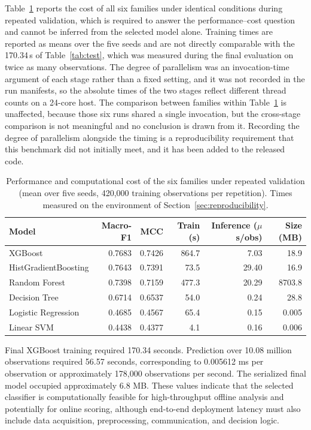 \documentclass[12pt,a4paper]{article}
\begin{document}
Table~\ref{tab:cost} reports the cost of all six families under identical
conditions during repeated validation, which is required to answer the
performance--cost question and cannot be inferred from the selected model
alone. Training times are reported as means over the five seeds and are
not directly comparable with the 170.34\,s of Table~\ref{tab:test}, which was
measured during the final evaluation on twice as many observations. The
degree of parallelism was an invocation-time argument of each stage rather
than a fixed setting, and it was not recorded in the run manifests, so the
absolute times of the two stages reflect different thread counts on a 24-core
host. The comparison between families within Table~\ref{tab:cost} is
unaffected, because those six runs shared a single invocation, but the
cross-stage comparison is not meaningful and no conclusion is drawn from it.
Recording the degree of parallelism alongside the timing is a reproducibility
requirement that this benchmark did not initially meet, and it has been added
to the released code.

\begin{table}[t]
\centering
\caption{Performance and computational cost of the six families under repeated
validation (mean over five seeds, 420,000 training observations per
repetition). Times measured on the environment of
Section~\ref{sec:reproducibility}.}
\label{tab:cost}
\small
\begin{tabular}{lrrrrr}
\toprule
Model & Macro-F1 & MCC & Train (s) & Inference ($\mu$s/obs) & Size (MB)\\
\midrule
XGBoost              & 0.7683 & 0.7426 & 864.7 & 7.03 & 18.9\\
HistGradientBoosting & 0.7643 & 0.7391 & 73.5 & 29.40 & 16.9\\
Random Forest        & 0.7398 & 0.7159 & 477.3 & 20.29 & 8703.8\\
Decision Tree        & 0.6714 & 0.6537 & 54.0 & 0.24 & 28.8\\
Logistic Regression  & 0.4685 & 0.4567 & 65.4 & 0.15 & 0.005\\
Linear SVM           & 0.4438 & 0.4377 & 4.1 & 0.16 & 0.006\\
\bottomrule
\end{tabular}
\end{table}

Final XGBoost training required 170.34 seconds. Prediction over 10.08 million
observations required 56.57 seconds, corresponding to 0.005612 ms per
observation or approximately 178,000 observations per second. The serialized
final model occupied approximately 6.8 MB. These values indicate that the
selected classifier is computationally feasible for high-throughput offline
analysis and potentially for online scoring, although end-to-end deployment
latency must also include data acquisition, preprocessing, communication, and
decision logic.
\end{document}
